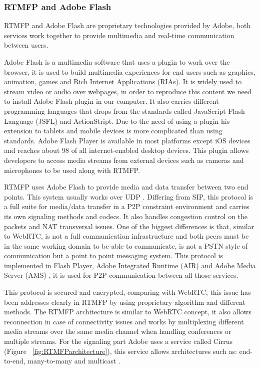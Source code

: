 \subsubsection{RTMFP and Adobe Flash}

RTMFP and Adobe Flash are proprietary technologies provided by Adobe, both services work together to provide multimedia and real-time communication between users.

Adobe Flash is a multimedia software that uses a plugin to work over the browser, it is used to build multimedia experiences for end users such as graphics, animation, games and Rich Internet Applications (RIAs). It is widely used to stream video or audio over webpages, in order to reproduce this content we need to install Adobe Flash plugin in our computer. It also carries different programming languages that drops from the standards called JavaScript Flash Language (JSFL) and ActionStript. Due to the need of using a plugin his extension to tablets and mobile devices is more complicated than using standards. Adobe Flash Player is available in most platforms except iOS devices and reaches about 98 of all internet-enabled desktop devices. This plugin allows developers to access media streams from external devices such as cameras and microphones to be used along with RTMFP.

RTMFP uses Adobe Flash to provide media and data transfer between two end points. This system usually works over UDP \cite{rtmfpDraft}. Differing from SIP, this protocol is a full suite for media/data transfer in a P2P constraint environment and carries its own signaling methods and codecs. It also handles congestion control on the packets and NAT transversal issues. One of the biggest differences is that, similar to WebRTC, is not a full communication infrastructure and both peers must be in the same working domain to be able to communicate, is not a PSTN style of communication but a point to point messaging system. This protocol is implemented in Flash Player, Adobe Integrated Runtime (AIR) and Adobe Media Server (AMS)  \cite{rtmfpDraft}, it is used for P2P communication between all those services. 

This protocol is secured and encrypted, comparing with WebRTC, this issue has been addresses clearly in RTMFP by using proprietary algorithm and different methods. The RTMFP architecture is similar to WebRTC concept, it also allows reconnection in case of connectivity issues and works by multiplexing different media streams over the same media channel when handling conferences or multiple streams. For the signaling part Adobe uses a service called Cirrus (Figure ~\ref{fig:RTMFParchitecture}), this service allows architectures such as: end-to-end, many-to-many and multicast \cite{cirrusFAQ}.
 
